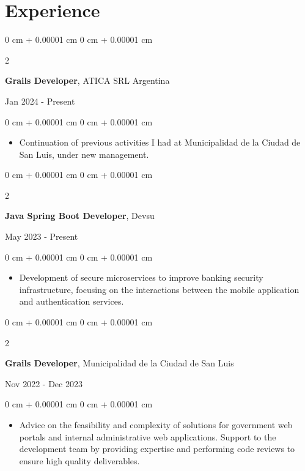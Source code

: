 \documentclass[10pt, letterpaper]{article}
\newenvironment{highlights}{
    \begin{itemize}[
        topsep=0.10 cm,
        parsep=0.10 cm,
        partopsep=0pt,
        itemsep=0pt,
        leftmargin=0 cm + 10pt
    ]
}{
    \end{itemize}
} %
\newenvironment{onecolentry}{
    \begin{adjustwidth}{
        0 cm + 0.00001 cm
    }{
        0 cm + 0.00001 cm
    }
}{
    \end{adjustwidth}
} %
\newenvironment{twocolentry}[2][]{
    \onecolentry
    \def\secondColumn{#2}
    \setcolumnwidth{\fill, 4.5 cm}
    \begin{paracol}{2}
}{
    \switchcolumn \raggedleft \secondColumn
    \end{paracol}
    \endonecolentry
} %
\begin{document}
    \section{Experience}
    \begin{twocolentry}{
        Jan 2024  - Present
    }
    \textbf{Grails Developer}, ATICA SRL Argentina
    \end{twocolentry}
    \vspace{0.10 cm}
    \begin{onecolentry}
        \begin{highlights}
            \item Continuation of previous activities I had at Municipalidad de la Ciudad de San Luis, under new management.
        \end{highlights}
    \end{onecolentry}  
    \vspace{0.2 cm}  
    \begin{twocolentry}{
        May 2023  - Present
    }
    \textbf{Java Spring Boot Developer}, Devsu
    \end{twocolentry}
    \vspace{0.10 cm}
    \begin{onecolentry}
        \begin{highlights}
            \item Development of secure microservices to improve banking security infrastructure, focusing on the interactions between the mobile application and authentication services.
        \end{highlights}
    \end{onecolentry}  
    \vspace{0.2 cm}  
    \begin{twocolentry}{
            Nov 2022  - Dec 2023
        }
    \textbf{Grails Developer}, Municipalidad de la Ciudad de San Luis
    \end{twocolentry}   
    \vspace{0.10 cm}
    \begin{onecolentry}
        \begin{highlights}
            \item Advice on the feasibility and complexity of solutions for government web portals and internal administrative web applications. Support to the development team by providing expertise and performing code reviews to ensure high quality deliverables.
        \end{highlights}
    \end{onecolentry}
\end{document}
